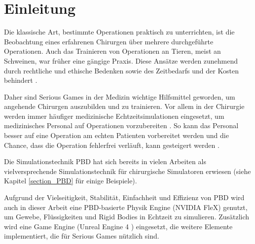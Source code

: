 \chapter{Einleitung}
\label{Motivation und Problemstellung}



Die klassische Art, bestimmte Operationen praktisch zu unterrichten, ist die Beobachtung eines erfahrenen Chirurgen über mehrere durchgeführte Operationen. Auch das Trainieren von Operationen an Tieren, meist an Schweinen, war früher eine gängige Praxis. Diese Ansätze werden zunehmend durch rechtliche und ethische Bedenken sowie des Zeitbedarfs und der Kosten behindert \cite{SurgSim}.

Daher sind Serious Games in der Medizin wichtige Hilfsmittel geworden, um 
angehende Chirurgen  %
auszubilden und zu trainieren. Vor allem in der Chirurgie werden immer häufiger medizinische Echtzeitsimulationen eingesetzt, um medizinisches Personal auf Operationen vorzubereiten \cite{SimRole}. So kann das Personal besser auf eine Operation am echten Patienten vorbereitet werden und die Chance, dass die Operation fehlerfrei verläuft, kann gesteigert werden \cite{VRNeuro}.

Die Simulationstechnik \ac{PBD} \cite{PBD} hat sich bereits in vielen Arbeiten als vielversprechende Simulationstechnik für chirurgische Simulatoren erwiesen (siehe Kapitel \ref{section_PBD} für einige Beispiele). 

Aufgrund der Vielseitigkeit, Stabilität, Einfachheit und Effizienz von PBD wird auch in dieser Arbeit eine PBD-basierte Physik Engine (NVIDIA FleX) genutzt, um Gewebe, Flüssigkeiten und Rigid Bodies in Echtzeit zu simulieren. Zusätzlich wird eine Game Engine (Unreal Engine 4 \cite{UE4FlexDoc}) eingesetzt, die weitere Elemente implementiert, die für Serious Games nützlich sind. 

